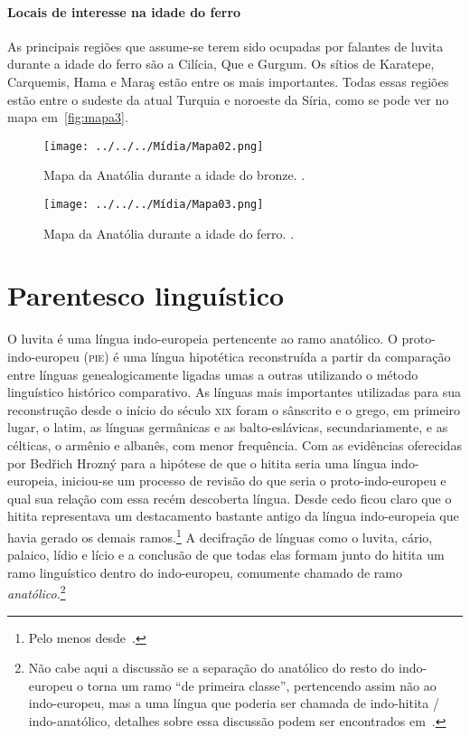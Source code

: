 \paragraph{Locais de interesse na idade do ferro}
As principais regiões que assume-se terem sido ocupadas por falantes de luvita
durante a idade do ferro são a Cilícia, Que e Gurgum.
Os sítios de Karatepe, Carquemis, Hama e Maraş estão entre os mais importantes.
Todas essas regiões estão entre o sudeste da atual Turquia e noroeste da Síria,
como se pode ver no mapa em~\autoref{fig:mapa3}.

\vfill
\clearpage

\begin{figure}[ht!]
	\begin{center}
		\texttt{[image: ../../../Mídia/Mapa02.png]}
	\end{center}
	\caption{Mapa da Anatólia durante a idade do bronze.
		\citet[37]{Melchert2003}.}\label{fig:mapa2}
	\begin{center}
		\texttt{[image: ../../../Mídia/Mapa03.png]}
	\end{center}
	\caption{Mapa da Anatólia durante a idade do ferro.
		\citet[94]{Melchert2003}.}\label{fig:mapa3}
\end{figure}

\clearpage

\section{Parentesco linguístico}

O luvita é uma língua indo-europeia pertencente ao ramo anatólico.
O proto-indo-europeu (\textsc{pie}) é uma língua hipotética reconstruída a
partir da comparação entre línguas genealogicamente ligadas umas a outras
utilizando o método linguístico histórico comparativo.
As línguas mais importantes utilizadas para sua reconstrução desde o início do
século \textsc{xix} foram o sânscrito e o grego, em primeiro lugar, o latim, as
línguas germânicas e as balto-eslávicas, secundariamente, e as célticas,
o armênio e albanês, com menor frequência.
Com as evidências oferecidas por Bedřich Hrozný para a hipótese de que o
hitita seria uma língua indo-europeia, iniciou-se um processo de revisão do que
seria o proto-indo-europeu e qual sua relação com essa recém descoberta língua.
Desde cedo ficou claro que o hitita representava um destacamento bastante antigo
da língua indo-europeia que havia gerado os demais ramos.\footnote{Pelo menos
	desde~\citet{Sturtevant1933}.}
A decifração de línguas como o luvita, cário, palaico, lídio e lício e a
conclusão de que todas elas formam junto do hitita um ramo linguístico dentro do
indo-europeu, comumente chamado de ramo \emph{anatólico}.\footnote{Não cabe aqui
	a discussão se a separação do anatólico do resto do indo-europeu o torna um
	ramo ``de primeira classe'', pertencendo assim não ao indo-europeu, mas a uma
	língua que poderia ser chamada de indo-hitita \slash{} indo-anatólico,
	detalhes sobre essa discussão podem ser encontrados em~\citet{Ringue2017}.}

